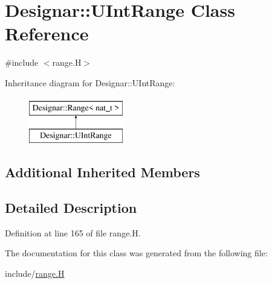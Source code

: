 \hypertarget{class_designar_1_1_u_int_range}{}\section{Designar\+:\+:U\+Int\+Range Class Reference}
\label{class_designar_1_1_u_int_range}


{\ttfamily \#include $<$range.\+H$>$}

Inheritance diagram for Designar\+:\+:U\+Int\+Range\+:\begin{figure}[H]
\begin{center}
\leavevmode
\includegraphics[height=2.000000cm]{class_designar_1_1_u_int_range}
\end{center}
\end{figure}
\subsection*{Additional Inherited Members}


\subsection{Detailed Description}


Definition at line 165 of file range.\+H.



The documentation for this class was generated from the following file\+:\begin{DoxyCompactItemize}
\item 
include/\hyperlink{range_8_h}{range.\+H}\end{DoxyCompactItemize}
